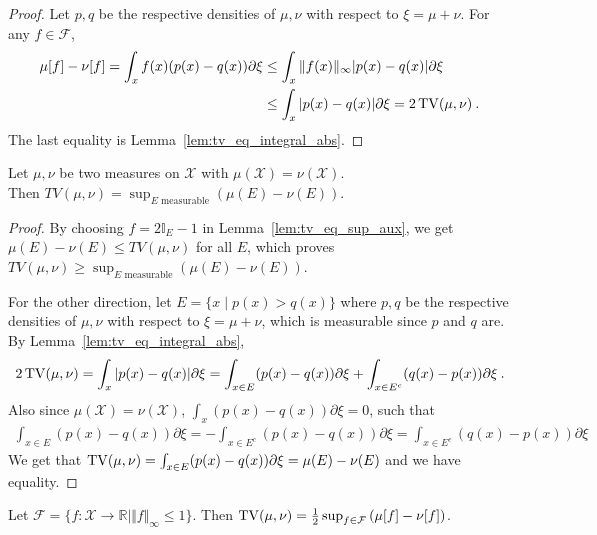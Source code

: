 \begin{proof}
Let $p,q$ be the respective densities of $\mu, \nu$ with respect to $\xi=\mu+\nu$.
For any $f \in \mathcal F$,
\begin{align*}
\mu[f] - \nu[f]
= \int_x f(x)(p(x) - q(x)) \partial\xi
&\le \int_x \Vert f(x) \Vert_\infty \vert p(x) - q(x) \vert \partial\xi
\\
&\le \int_x \vert p(x) - q(x) \vert \partial\xi
= 2 \operatorname{TV}(\mu, \nu)
\: .
\end{align*}
The last equality is Lemma~\ref{lem:tv_eq_integral_abs}.
\end{proof}

\begin{theorem}
  \label{thm:tv_eq_sup_sub_measure}
  Let $\mu, \nu$ be two measures on $\mathcal X$ with $\mu(\mathcal X) = \nu(\mathcal X)$.\\
  Then $TV(\mu, \nu) = \sup_{E \text{ measurable}} \left( \mu(E) - \nu(E) \right)$.
\end{theorem}

\begin{proof}
By choosing $f = 2 \mathbb{I}_E - 1$ in Lemma~\ref{lem:tv_eq_sup_aux}, we get $\mu(E) - \nu(E) \le TV(\mu, \nu)$ for all $E$, which proves
$TV(\mu, \nu) \ge \sup_{E \text{ measurable}} \left( \mu(E) - \nu(E) \right)$.

For the other direction, let $E = \{x \mid p(x) > q(x)\}$ where $p,q$ be the respective densities of $\mu, \nu$ with respect to $\xi=\mu+\nu$, which is measurable since $p$ and $q$ are. By Lemma~\ref{lem:tv_eq_integral_abs},
\begin{align*}
2\operatorname{TV}(\mu, \nu)
= \int_x \vert p(x) - q(x) \vert \partial \xi
= \int_{x \in E} (p(x) - q(x)) \partial \xi + \int_{x \in E^c} (q(x) - p(x)) \partial \xi
\: .
\end{align*}
Also since $\mu(\mathcal X) = \nu(\mathcal X)$, $\int_x (p(x) - q(x)) \partial \xi = 0$, such that
\begin{align*}
\int_{x \in E} (p(x) - q(x)) \partial \xi
= - \int_{x \in E^c} (p(x) - q(x)) \partial \xi
= \int_{x \in E^c} (q(x) - p(x)) \partial \xi
\end{align*}
We get that $\operatorname{TV}(\mu, \nu) = \int_{x \in E} (p(x) - q(x)) \partial \xi = \mu(E) - \nu(E)$ and we have equality.
\end{proof}

\begin{theorem}
  \label{thm:tv_eq_sup_sub_integral}
  Let $\mathcal F = \{f : \mathcal X \to \mathbb{R} \mid \Vert f \Vert_\infty \le 1\}$.
  Then $\operatorname{TV}(\mu, \nu) = \frac{1}{2} \sup_{f \in \mathcal F} \left( \mu[f] - \nu[f] \right)$.
\end{theorem}

